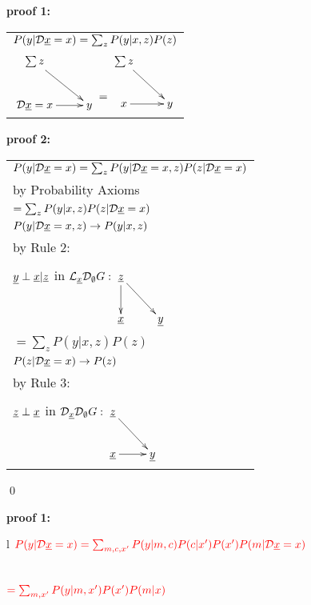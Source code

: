{\bf * proof 1:}
\begin{longtable}{l}
\color{red}
$P(y|{\cal D}{\underline{x}}=x)=\sum_z
 P(y|x, z)P(z)$
\\
$\xymatrix{
\sum z\ar[dr]
\\
\cald \rvx=x\ar[r]
&y
}
\xymatrix{\\=}
\xymatrix{
\sum z\ar[dr]
\\
x\ar[r]
&y
}
$
\end{longtable}


{\bf * proof 2:}
\begin{longtable}{l}
\color{red}
$P(y|{\cal D}{\underline{x}}=x)
=
\sum_z
P(y|{\cal D}{\underline{x}}=x, z)
P(z|{\cal D}{\underline{x}}=x)$
\\
\quad by Probability Axioms
\\
\color{red}
$=\sum_z
P(y|x, z)
P(z|{\cal D}{\underline{x}}=x)$
\\
\quad $P(y|{\cal D} {\underline{x}}=x, z)\rightarrow
P(y|x, z)$
\\
\quad  by Rule 2:
\begin{tabular}{l}
\\
\end{tabular}
\\
\quad
${\underline{y}}\perp{\underline{x}}|{\underline{z}}$ in
$\call_\rvx\cald_\emptyset G:
\xymatrix{
\rvz\ar[d]\ar[rd]
\\
\rvx
&\rvy
}$
\\
\color{red}
$=\sum_z
P(y|x, z)
P(z)$
\\
\quad $P(z|{\cal D} {\underline{x}}=x)\rightarrow
P(z)$
\\
\quad  by Rule 3:
\begin{tabular}{l}
\\
\end{tabular}
\\
\quad
${\underline{z}}\perp {\underline{x}}$ in
$\cald_\rvx \cald_\emptyset G:
\xymatrix{
\rvz\ar[rd]
\\
\rvx\ar[r]
&\rvy
}
$
\end{longtable}
\qed


\begin{claim}
\label{cl-decFrontDoor}
\decFrontDoor
\end{claim}

\proof


{\bf * proof 1:}
\\
\begin{longtable}{l}
$\color{red}
P(y|{\cal D}{\underline{x}}=x)=
\sum_{m, c, x'}
P(y|m, c)P(c|x')P(x')
P(m|{\cal D}{\underline{x}}=x)$
\\
\\
\xymatrix{\\=}
\\
$\color{red}=
\sum_{m,x'}
P(y|m, x')
P(x')
P(m|x)$
\\
\xymatrix{\\=}
\end{longtable}



